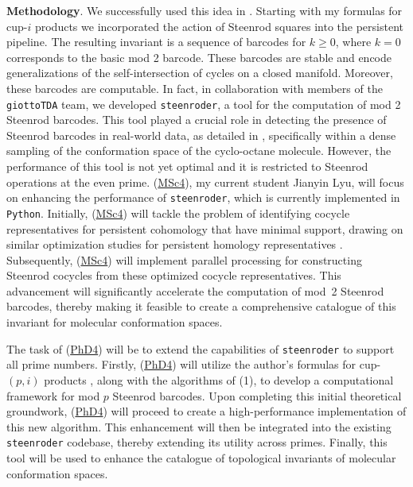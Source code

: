 \medskip\noindent\textbf{Methodology}.
We successfully used this idea in \cite{medina2022per_st}.
Starting with my formulas for cup-$i$ products \cite{medina2023fast_sq} we incorporated the action of Steenrod squares into the persistent pipeline.
The resulting invariant is a sequence of barcodes for $k \geq 0$, where $k = 0$ corresponds to the basic mod 2 barcode.
These barcodes are stable and encode generalizations of the self-intersection of cycles on a closed manifold.
Moreover, these barcodes are computable.
In fact, in collaboration with members of the \texttt{giottoTDA} team, we developed \texttt{steenroder}, a tool for the computation of mod 2 Steenrod barcodes.
This tool played a crucial role in detecting the presence of Steenrod barcodes in real-world data, as detailed in \cite{medina2022per_st}, specifically within a dense sampling of the conformation space of the cyclo-octane molecule.
However, the performance of this tool is not yet optimal and it is restricted to Steenrod operations at the even prime.
(\underline{MSc4}), my current student Jianyin Lyu, will focus on enhancing the performance of \texttt{steenroder}, which is currently implemented in \texttt{Python}.
Initially, (\underline{MSc4}) will tackle the problem of identifying cocycle representatives for persistent cohomology that have minimal support, drawing on similar optimization studies for persistent homology representatives \cite{obayashi2018optimal}.
Subsequently, (\underline{MSc4}) will implement parallel processing for constructing Steenrod cocycles from these optimized cocycle representatives.
This advancement will significantly accelerate the computation of mod~2 Steenrod barcodes, thereby making it feasible to create a comprehensive catalogue of this invariant for molecular conformation spaces.

\quad The task of (\underline{PhD4}) will be to extend the capabilities of \texttt{steenroder} to support all prime numbers.
Firstly, (\underline{PhD4}) will utilize the author's formulas for cup-$(p,i)$ products \cite{medina2021may_st}, along with the algorithms of (1), to develop a computational framework for mod $p$ Steenrod barcodes.
Upon completing this initial theoretical groundwork, (\underline{PhD4}) will proceed to create a high-performance implementation of this new algorithm.
This enhancement will then be integrated into the existing \texttt{steenroder} codebase, thereby extending its utility across primes.
Finally, this tool will be used to enhance the catalogue of topological invariants of molecular conformation spaces.

